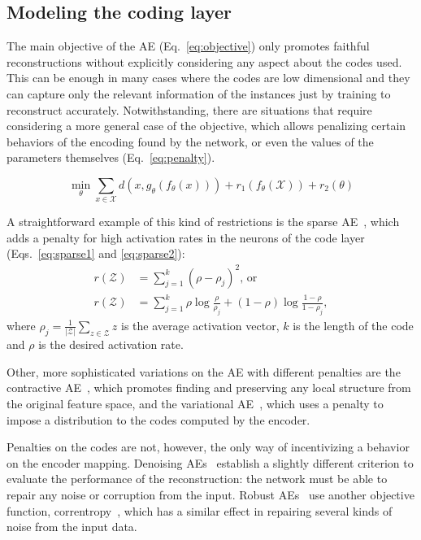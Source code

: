 \documentclass[
	fontsize=11pt, %
	twoside=false, %
	open=any, %
	secnumdepth=1, %
]{kaobook}
\begin{document}
\subsection{Modeling the coding layer}\label{sec:modelcode}

The main objective of the AE (Eq.~\ref{eq:objective}) only promotes faithful reconstructions without explicitly considering any aspect about the codes used. This can be enough in many cases where the codes are low dimensional and they can capture only the relevant information of the instances just by training to reconstruct accurately. Notwithstanding, there are situations that require considering a more general case of the objective, which allows penalizing certain behaviors of the encoding found by the network, or even the values of the parameters themselves (Eq.~\ref{eq:penalty}).

\begin{equation}\label{eq:penalty}
    \min_{\theta}\sum_{x\in\mathcal X} d(x,g_{\theta}(f_{\theta}(x)))+r_1(f_{\theta}(\mathcal X))+r_2(\theta)
\end{equation}

A straightforward example of this kind of restrictions is the sparse AE~\cite{lee_sparse_2008,ng2011sparse}, which adds a penalty for high activation rates in the neurons of the code layer (Eqs.~\ref{eq:sparse1} and \ref{eq:sparse2}):
\begin{align}
    \label{eq:sparse1}
    r(\mathcal Z)&=\sum_{j=1}^k(\rho-\rho_j)^2\mbox{, or}\\
    \label{eq:sparse2}
    r(\mathcal Z)&=\sum_{j=1}^k \rho \log\frac{\rho}{\rho_j}+(1-\rho)\log\frac{1-\rho}{1-\rho_j},
\end{align}
where $\rho_j=\frac{1}{\lvert\mathcal Z\rvert}\sum_{z\in \mathcal Z}z$ is the average activation vector, $k$ is the length of the code and $\rho$ is the desired activation rate.

Other, more sophisticated variations on the AE with different penalties are the contractive AE~\cite{contractive,rifai2011higher}, which promotes finding and preserving any local structure from the original feature space, and the variational AE~\cite{variational}, which uses a penalty to impose a distribution to the codes computed by the encoder.

Penalties on the codes are not, however, the only way of incentivizing a behavior on the encoder mapping. Denoising AEs~\cite{vincent2008extracting,sdae} establish a slightly different criterion to evaluate the performance of the reconstruction: the network must be able to repair any noise or corruption from the input.  Robust AEs~\cite{qi_robust_2014} use another objective function, correntropy~\cite{correntropy}, which has a similar effect in repairing several kinds of noise from the input data.
\end{document}
